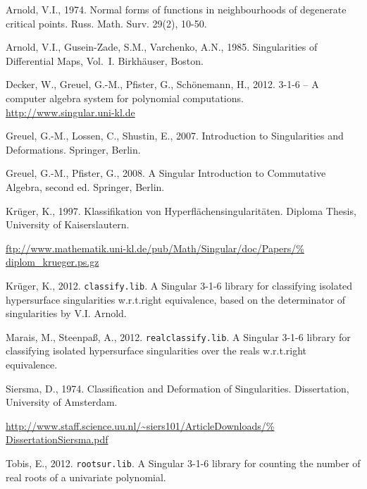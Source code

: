 \documentclass[noend]{amsproc}
\theoremstyle{definition}
\begin{document}
\begin{thebibliography}{99}

Arnold, V.I., 1974.
Normal forms of functions in neighbourhoods of degenerate critical points.
Russ. Math. Surv. 29(2), 10-50.

Arnold, V.I., Gusein-Zade, S.M., Varchenko, A.N., 1985.
Singularities of Differential Maps, Vol.~I.
Birkh\"auser, Boston.

Decker, W., Greuel, G.-M., Pfister, G., Sch{\"o}nemann, H., 2012.
 {3-1-6} -- {A} computer algebra system for polynomial
computations. \\
\url{http://www.singular.uni-kl.de}

Greuel, G.-M., Lossen, C., Shustin, E., 2007.
Introduction to Singularities and Deformations.
Springer, Berlin.

Greuel, G.-M., Pfister, G., 2008.
A Singular Introduction to Commutative Algebra, second ed.
Springer, Berlin.

Kr\"uger, K., 1997.
Klassifikation von Hyperfl\"achensingularit\"aten.
Diploma Thesis, University of Kaiserslautern.
{\par\raggedright
\url{ftp://www.mathematik.uni-kl.de/pub/Math/Singular/doc/Papers/%
diplom_krueger.ps.gz}
\par}

Kr\"uger, K., 2012.
{\tt classify.lib}. {A} {\sc Singular} {3-1-6} library for classifying isolated
hypersurface singularities w.r.t.\@ right equivalence, based on the
determinator of singularities by V.I. Arnold.

Marais, M., Steenpa\ss, A., 2012.
{\tt realclassify.lib}. {A} {\sc Singular} {3-1-6} library for classifying
isolated hypersurface singularities over the reals w.r.t.\@ right equivalence.

Siersma, D., 1974.
Classification and Deformation of Singularities.
Dissertation, University of Amsterdam.
{\par\raggedright
\url{http://www.staff.science.uu.nl/~siers101/ArticleDownloads/%
DissertationSiersma.pdf}
\par}

Tobis, E., 2012.
{\tt rootsur.lib}. {A} {\sc Singular} {3-1-6} library for counting the number
of real roots of a univariate polynomial.

\end{thebibliography}
\end{document}
